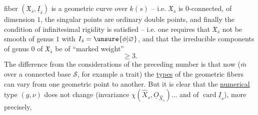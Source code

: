 fiber $(\mathfrak X_{\bar s},\underline I_{\bar s})$ is a geometric curve over $k(s)$ -- i.e. $\mathfrak X_{\bar s}$ is $0$-connected, of dimension $1$,  the singular points are  ordinary double points, and finally the condition of infinitesimal rigidity  is satisfied --  i.e. one requires that $\mathfrak X_{\bar s}$ not be smooth of genus $1$ with $I_{\bar s}=\unsure{\phi|\varnothing}$, and that the irreducible components of genus $0$ of $\mathfrak X_{\bar s}$ be of ``marked weight''
\[
\geqslant 3.
\]
The difference from the considerations of the preceding number is that now ($\bar m$ over a connected base $\mathcal S$, for example  a trait) the \uline{types} of the geometric fibers can vary from one geometric point to another. But it is clear that the \uline{numerical} type $(g,\nu)$ does not change (invariance  $\chi(\widehat X_s,\underline O_{\widehat X_s})\ldots$ and of $\operatorname{card}\underline I_s$), more precisely,
